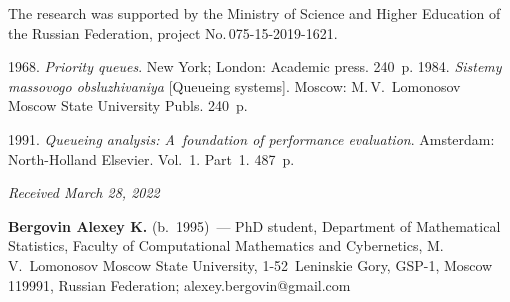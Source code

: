 



\vspace*{-18pt}

\Ack

\vspace*{-3pt}

\noindent
 The research was supported by the Ministry of Science and Higher Education of the Russian Federation, project No.\,075-15-2019-1621.


  \begin{multicols}{2}

\renewcommand{\bibname}{\protect\rmfamily References}

{\small\frenchspacing
 {%
 \begin{thebibliography}{9} 
 1968. \textit{Priority queues}.  New York; London: Academic press.  240~p.
 1984. 
\textit{Sis\-te\-my mas\-so\-vo\-go obslu\-zhi\-va\-niya} [Queueing systems]. Moscow: M.\,V.~Lomonosov Moscow State University Publs. 240~p.
{

} 
 1991. \textit{Queueing analysis: A~foundation of performance evaluation}. 
 Amsterdam: North-Holland Elsevier.  Vol.~1. Part~1. 487~p.
\end{thebibliography}

 }
 }

\end{multicols}

\vspace*{-8pt}

\hfill{\small\textit{Received March 28, 2022}} 

\pagebreak
 
\Contr

\noindent
\textbf{Bergovin Alexey K.} (b.\ 1995)~---  
PhD student, Department of Mathematical Statistics, Faculty of Computational Mathematics and Cybernetics, 
M.\,V.~Lomonosov Moscow State University, 1-52~Leninskie Gory, GSP-1, Moscow 119991, Russian Federation; \mbox{alexey.bergovin@gmail.com}

